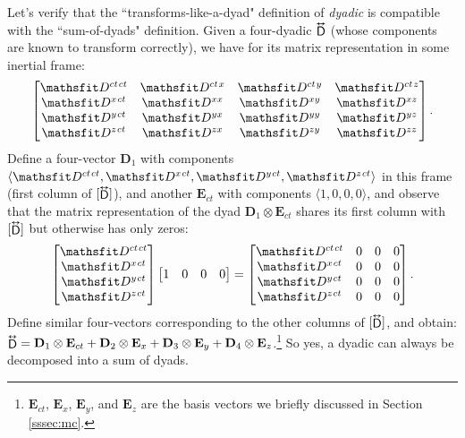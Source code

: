 \documentclass[12pt]{article}
\renewcommand{\vv}[1]{\mathbf{#1}}
\newcommand{\tightoverset}[2]{%
  \mathop{#2}\limits^{\vbox to -.5ex{\kern-0.75ex\hbox{$#1$}\vss}}}
\newcommand{\inlinedy}[1]{\tightoverset{\text{\tiny$\bm\leftrightarrow$}}{#1}}
\begin{document}
Let's verify that the ``transforms-like-a-dyad" definition of \emph{dyadic} is compatible with the ``sum-of-dyads" definition. Given a four-dyadic $\inlinedy{\mathsf{D}}$ (whose components are known to transform correctly), we have for its matrix representation in some inertial frame:
\begin{equation*}
\begin{bmatrix}
\mathsfit D^{ct \mkern1.5mu ct} & \mathsfit D^{ct \mkern1.5mu x} & \mathsfit D^{ct \mkern1.5mu y} & \mathsfit D^{ct \mkern1.5mu z} \\
\mathsfit D^{x \mkern1.5mu ct} & \mathsfit D^{x x} & \mathsfit D^{x y} & \mathsfit D^{x z}  \\
\mathsfit D^{y \mkern1.5mu ct} & \mathsfit D^{y x} & \mathsfit D^{y y} & \mathsfit D^{y z}  \\
\mathsfit D^{z \mkern1.5mu ct} & \mathsfit D^{z x} & \mathsfit D^{z y} & \mathsfit D^{z z} 
\end{bmatrix}.
\end{equation*}
Define a four-vector $\vv D_1$ with components $\langle \mathsfit D^{ct \mkern1.5mu ct}, \mathsfit D^{x \mkern1.5mu ct}, \mathsfit D^{y \mkern1.5mu ct}, \mathsfit D^{z \mkern1.5mu ct} \rangle$ in this frame (first column of $[ \inlinedy{\mathsf{D}} ]$), and another $\vv E_{ct}$ with components $\langle 1, 0, 0, 0 \rangle$, and observe that the matrix representation of the dyad $\vv D_1 \otimes \vv E_{ct}$ shares its first column with $[ \inlinedy{\mathsf{D}} ]$ but otherwise has only zeros:
\begin{equation*}
\begin{bmatrix}
\mathsfit D^{ct \mkern1.5mu ct} \\
\mathsfit D^{x \mkern1.5mu ct} \\
 \mathsfit D^{y \mkern1.5mu ct} \\
\mathsfit D^{z \mkern1.5mu ct}
\end{bmatrix}
\begin{bmatrix}
1 & 0 & 0 & 0
\end{bmatrix}
=
\begin{bmatrix}
\mathsfit D^{ct \mkern1.5mu ct} & 0 & 0 & 0 \\
\mathsfit D^{x \mkern1.5mu ct} & 0 & 0 & 0 \\
\mathsfit D^{y \mkern1.5mu ct} & 0 & 0 & 0 \\
\mathsfit D^{z \mkern1.5mu ct} & 0 & 0 & 0
\end{bmatrix}.
\end{equation*}
Define similar four-vectors corresponding to the other columns of $[ \inlinedy{\mathsf{D}} ]$, and obtain: $\inlinedy{\mathsf{D}} = \vv D_1 \otimes \vv E_{ct} + \vv D_2 \otimes \vv E_{x} + \vv D_3 \otimes \vv E_{y} + \vv D_4 \otimes \vv E_{z}$.\footnote{$\vv E_{ct}$, $\vv E_{x}$, $\vv E_{y}$, and $\vv E_{z}$ are the basis vectors we briefly discussed in Section \ref{sssec:mc}.} So yes, a dyadic can always be decomposed into a sum of dyads.
\end{document}
